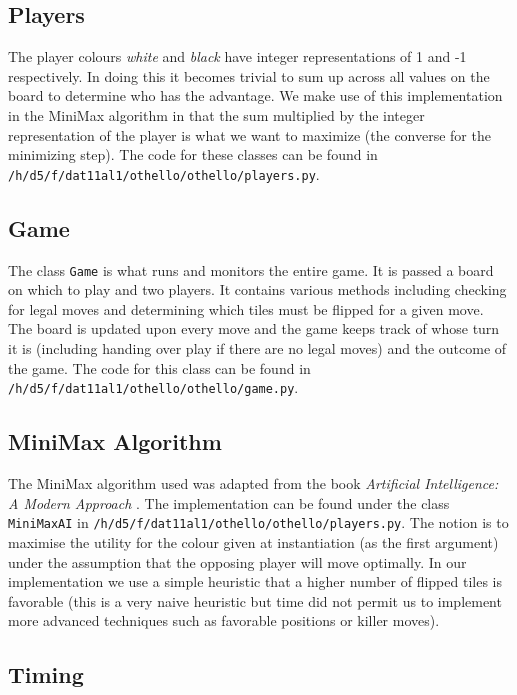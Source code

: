 \documentclass{article}
\begin{document}
\subsection{Players}

The player colours \textit{white} and \textit{black} have integer representations of 1 and -1 respectively. In doing this it becomes trivial to sum up across all values on the board to determine who has the advantage. We make use of this implementation in the MiniMax algorithm in that the sum multiplied by the integer representation of the player is what we want to maximize (the converse for the minimizing step). The code for these classes can be found in \texttt{/h/d5/f/dat11al1/othello/othello/players.py}.

\subsection{Game}

The class \texttt{Game} is what runs and monitors the entire game. It is passed a board on which to play and two players. It contains various methods including checking for legal moves and determining which tiles must be flipped for a given move. The board is updated upon every move and the game keeps track of whose turn it is (including handing over play if there are no legal moves) and the outcome of the game. The code for this class can be found in \texttt{/h/d5/f/dat11al1/othello/othello/game.py}.


\subsection{MiniMax Algorithm}

The MiniMax algorithm used was adapted from the book \textit{Artificial Intelligence: A Modern Approach} \cite{Russell:2003:AIM:773294}. The implementation can be found under the class \texttt{MiniMaxAI} in \texttt{/h/d5/f/dat11al1/othello/othello/players.py}. The notion is to maximise the utility for the colour given at instantiation (as the first argument) under the assumption that the opposing player will move optimally. In our implementation we use a simple heuristic that a higher number of flipped tiles is favorable (this is a very naive heuristic but time did not permit us to implement more advanced techniques such as favorable positions or killer moves).


\subsection{Timing}
\end{document}
